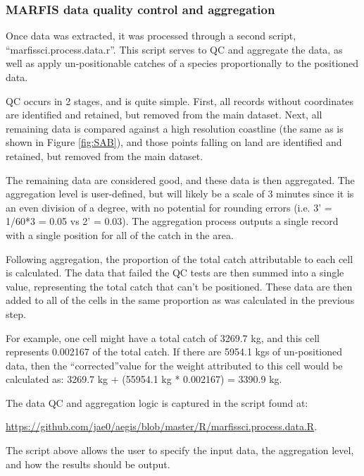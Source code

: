 \documentclass[letterpaper,portrait,11pt]{scrartcl}
\numberwithin{equation}{section}    %
\numberwithin{figure}{section}    %
\numberwithin{table}{section}       %
\begin{document}

\subsubsection{MARFIS data quality control and aggregation}
Once data was extracted, it was processed through a second script, \textquotedblleft marfissci.process.data.r\textquotedblright.  This script serves to QC and aggregate the data, as well as apply un-positionable catches of a species proportionally to the positioned data.

QC occurs in 2 stages, and is quite simple.  First, all records without coordinates are identified and retained, but removed from the main dataset.  Next, all remaining data is compared against a high resolution coastline (the same as is shown in Figure \ref{fig:SAB}), and those points falling on land are identified and retained, but removed from the main dataset.

The remaining data are considered good, and these data is then aggregated.  The aggregation level is user-defined, but will likely be a scale of 3 minutes since it is an even division of a degree, with no potential for rounding errors (i.e. 3' = 1/60*3 = 0.05 vs 2' = 0.03).  The aggregation process outputs a single record with a single position for all of the catch in the area.

Following aggregation, the proportion of the total catch attributable to each cell is calculated.  The data that failed the QC tests are then summed into a single value, representing the total catch that can\textquoteright t be positioned.  These data are then added to all of the cells in the same proportion as was calculated in the previous step.

For example, one cell might have a total catch of 3269.7 kg, and this cell represents 0.002167 of the total catch.  If there are 5954.1 kgs of un-positioned data, then the \textquotedblleft corrected\textquotedblright value for the weight attributed to this cell would be calculated as:
3269.7 kg + (55954.1 kg * 0.002167) = 3390.9 kg.


The data QC and aggregation logic is captured in the script found at:

\url{https://github.com/jae0/aegis/blob/master/R/marfissci.process.data.R}.

The script above allows the user to specify the input data, the aggregation level, and how the results should be output.
\end{document}
